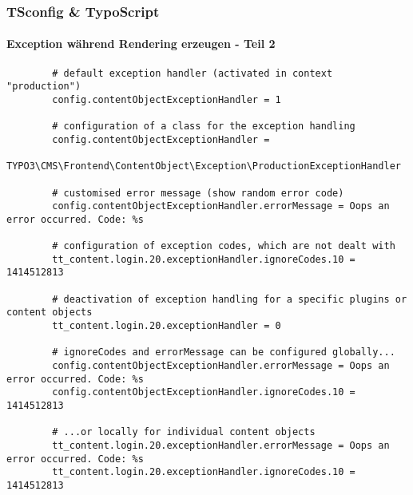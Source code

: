 \begin{frame}[fragile]
	\frametitle{TSconfig \& TypoScript}
	\framesubtitle{Exception während Rendering erzeugen - Teil 2}
	
	\lstset{
		basicstyle=\tiny\ttfamily
	}
	
	\begin{lstlisting}
		# default exception handler (activated in context "production")
		config.contentObjectExceptionHandler = 1

		# configuration of a class for the exception handling
		config.contentObjectExceptionHandler =
		  TYPO3\CMS\Frontend\ContentObject\Exception\ProductionExceptionHandler

		# customised error message (show random error code)
		config.contentObjectExceptionHandler.errorMessage = Oops an error occurred. Code: %s

		# configuration of exception codes, which are not dealt with
		tt_content.login.20.exceptionHandler.ignoreCodes.10 = 1414512813

		# deactivation of exception handling for a specific plugins or content objects
		tt_content.login.20.exceptionHandler = 0

		# ignoreCodes and errorMessage can be configured globally...
		config.contentObjectExceptionHandler.errorMessage = Oops an error occurred. Code: %s
		config.contentObjectExceptionHandler.ignoreCodes.10 = 1414512813

		# ...or locally for individual content objects
		tt_content.login.20.exceptionHandler.errorMessage = Oops an error occurred. Code: %s
		tt_content.login.20.exceptionHandler.ignoreCodes.10 = 1414512813
	\end{lstlisting}

\end{frame}

